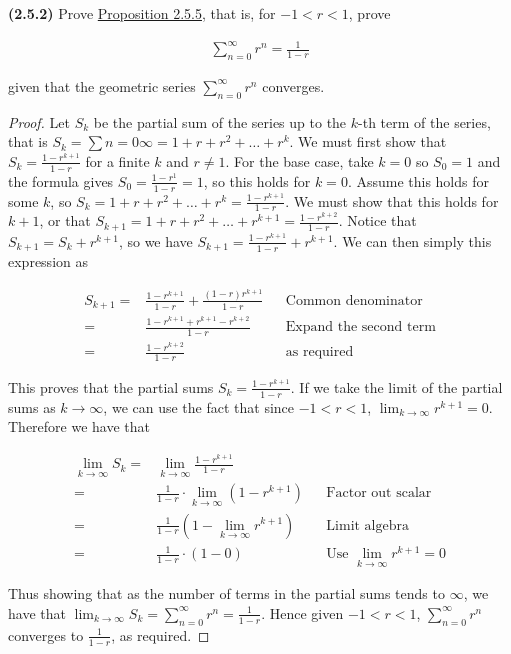 \documentclass[12pt]{article}
\newcommand{\limtoinf}[1][n]{\displaystyle\lim_{ {#1} \to \infty}}
\newcommand{\paren}[1]{\left( {#1} \right)}
\newcommand{\series}[2]{\displaystyle \sum_{ {#1} }^{ {#2} }}
\begin{document}
\pagestyle{fancy}
\setlength{\headheight}{14.49998pt}
\fancyfoot[C]{\thepage}

\noindent \textbf{(2.5.2)} Prove \underline{Proposition 2.5.5}, that is, for $-1<r<1$, prove

\begin{align*}
	\series{n=0}{\infty}r^n=\frac{1}{1-r}
\end{align*}

\noindent given that the geometric series $\series{n=0}{\infty}r^n$ converges.

\begin{proof}
	Let $S_k$ be the partial sum of the series up to the $k$-th term of the series, that is $S_k=\sum{n=0}{\infty}=1+r+r^2+\dots+r^k$. We must first show that $S_k=\frac{1-r^{k+1}}{1-r}$ for a finite $k$ and $r\neq1$. For the base case, take $k=0$ so $S_0=1$ and the formula gives $S_0=\frac{1-r^1}{1-r}=1$, so this holds for $k=0$. Assume this holds for some $k$, so $S_k=1+r+r^2+\dots+r^k=\frac{1-r^{k+1}}{1-r}$. We must show that this holds for $k+1$, or that $S_{k+1}=1+r+r^2+\dots+r^{k+1}=\frac{1-r^{k+2}}{1-r}$. Notice that $S_{k+1}=S_k+r^{k+1}$, so we have $S_{k+1}=\frac{1-r^{k+1}}{1-r}+r^{k+1}$. We can then simply this expression as
	
\begin{align*}
	S_{k+1}=&\frac{1-r^{k+1}}{1-r}+\frac{(1-r)r^{k+1}}{1-r} && \text{Common denominator} \\
	=&\frac{1-r^{k+1}+r^{k+1}-r^{k+2}}{1-r} && \text{Expand the second term} \\
	=& \frac{1-r^{k+2}}{1-r} && \text{as required}
\end{align*}

This proves that the partial sums $S_k=\frac{1-r^{k+1}}{1-r}$. If we take the limit of the partial sums as $k\to\infty$, we can use the fact that since $-1<r<1$, $\limtoinf[k]r^{k+1}=0$. Therefore we have that

\begin{align*}
	\limtoinf[k]S_k=&\limtoinf[k]\frac{1-r^{k+1}}{1-r} \\
	=& \frac{1}{1-r}\cdot\limtoinf[k]\paren{1-r^{k+1}} && \text{Factor out scalar} \\
	=& \frac{1}{1-r}\paren{1- \limtoinf[k]r^{k+1}} && \text{Limit algebra} \\ 
	=& \frac{1}{1-r}\cdot\paren{1-0} && \text{Use }\limtoinf[k]r^{k+1}=0
\end{align*}

Thus showing that as the number of terms in the partial sums tends to $\infty$, we have that $\limtoinf[k]S_k=\series{n=0}{\infty}r^n=\frac{1}{1-r}$. Hence given $-1<r<1$, $\series{n=0}{\infty}r^n$ converges to $\frac{1}{1-r}$, as required.
\end{proof}
\end{document}
